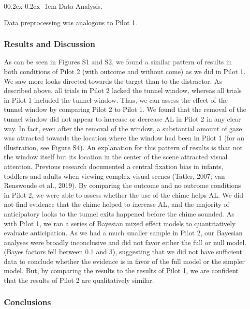 \documentclass[
  man, donotrepeattitle,floatsintext]{apa6}
\makeatletter
\let\oldparagraph\paragraph
\renewcommand{\paragraph}{
    \@ifstar
      \xxxParagraphStar
      \xxxParagraphNoStar
  }
\newcommand{\xxxParagraphStar}[1]{\oldparagraph*{#1}\mbox{}}
\newcommand{\xxxParagraphNoStar}[1]{\oldparagraph{#1}\mbox{}}
\renewcommand{\paragraph}{\@startsection{paragraph}{4}{\parindent}%
  {0\baselineskip \@plus 0.2ex \@minus 0.2ex}%
  {-1em}%
  {\normalfont\normalsize\bfseries\itshape\typesectitle}}
\makeatother
\begin{document}
\paragraph{Data Analysis.}\label{data-analysis.-1}

Data preprocessing was analogous to Pilot 1.

\subsubsection{Results and Discussion}\label{results-and-discussion}

As can be seen in Figures S1 and S2, we found a similar pattern of results in both conditions of Pilot 2 (with outcome and without come) as we did in Pilot 1. We saw more looks directed towards the target than to the distractor. As described above, all trials in Pilot 2 lacked the tunnel window, whereas all trials in Pilot 1 included the tunnel window. Thus, we can assess the effect of the tunnel window by comparing Pilot 2 to Pilot 1. We found that the removal of the tunnel window did not appear to increase or decrease AL in Pilot 2 in any clear way. In fact, even after the removal of the window, a substantial amount of gaze was attracted towards the location where the window had been in Pilot 1 (for an illustration, see Figure S4). An explanation for this pattern of results is that not the window itself but its location in the center of the scene attracted visual attention. Previous research documented a central fixation bias in infants, toddlers and adults when viewing complex visual scenes (Tatler, 2007; van Renswoude et al., 2019).
By comparing the outcome and no outcome conditions in Pilot 2, we were able to assess whether the use of the chime helps AL. We did not find evidence that the chime helped to increase AL, and the majority of anticipatory looks to the tunnel exits happened before the chime sounded. As with Pilot 1, we ran a series of Bayesian mixed effect models to quantitatively evaluate anticipation. As we had a much smaller sample in Pilot 2, our Bayesian analyses were broadly inconclusive and did not favor either the full or null model. (Bayes factors fell between 0.1 and 3), suggesting that we did not have sufficient data to conclude whether the evidence is in favor of the full model or the simpler model. But, by comparing the results to the results of Pilot 1, we are confident that the results of Pilot 2 are qualitatively similar.

\subsubsection{Conclusions}\label{conclusions}
\end{document}
